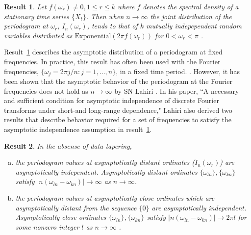 \documentclass{article}\usepackage[]{graphicx}\usepackage[]{color}
\theoremstyle{plain}
\newtheorem{res}{Result}
\begin{document}
\begin{res} \label{res:first}
Let $f(\omega_r) \not= 0, 1 \le r \le k$ where $f$ denotes the spectral density of a stationary time series $\{X_t\}$. Then when $n\rightarrow \infty$ the joint distribution of the periodogram at $\omega_r$, $I_n(\omega_r)$, tends to that of $k$ mutually indepependent random variables distributed as $\text{Exponential}(2\pi f(\omega_r))$ for $0<\omega_r<\pi$ \cite{brockwell2002introduction}. 
\end{res}

Result~\ref{res:first} describes the asymptotic distribution of a periodogram at fixed frequencies. In practice, this result has often been used with the Fourier frequencies, $\{\omega_j = 2\pi j/n : j=1,...,n\}$, in a fixed time period. \cite{brockwell2002introduction}. However, it has been shown that the asymptotic behavior of the periodogram at the Fourier frequencies does not hold as $n \rightarrow \infty$ by SN Lahiri \cite{lahiri2003necessary}. In his paper, ``A necessary and sufficient condition for asymptotic independence of discrete Fourier transforms under short-and long-range dependence," Lahiri also derived two results that describe behavior required for a set of frequencies to satisfy the asymptotic independence assumption in result~\ref{res:first}.

\begin{res} \label{res:lahiri}
In the absense of data tapering,
\begin{enumerate}[(a)]
\item the periodogram values at asymptotically distant ordinates ($I_n(\omega_r)$) are asymptotically independent.  Asymptotically distant ordinates $\{\omega_{ln}\}, \{\omega_{kn}\}$ satisfy $|n(\omega_{ln} - \omega_{kn})| \rightarrow \infty$ as $n \rightarrow \infty$.

\item the periodogram values at asymptotically close ordinates which are asymptotically distant from the sequence $\{0\}$ are asymptotically independent. Asymptotically close ordinates $\{\omega_{ln}\}, \{\omega_{kn}\}$ satisfy $|n(\omega_{ln} - \omega_{kn})| \rightarrow 2\pi l$ for some nonzero integer $l$ as $n \rightarrow \infty$ \cite{lahiri2003necessary}.
\end{enumerate}
\end{res}

\end{document}
